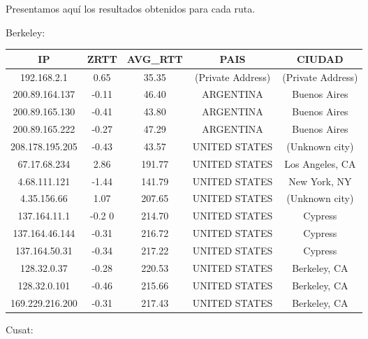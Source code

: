 Presentamos aquí los resultados obtenidos para cada ruta.

Berkeley:

\begin{tabular}{|c@{\hspace{5ex}}c@{\hspace{5ex}}c@{\hspace{5ex}}c@{\hspace{5ex}}c|}
 \hline
 \rule{0pt}{1.2em}IP & ZRTT & AVG\_RTT & PAIS & CIUDAD\\[0.2em]
 \hline

\rule{0pt}{1.2em} 192.168.2.1  &  0.65 & 35.35 & (Private Address) & (Private Address) \\[0.2em]
\rule{0pt}{1.2em} 200.89.164.137  &  -0.11 & 46.40 & ARGENTINA & Buenos Aires \\[0.2em]
\rule{0pt}{1.2em} 200.89.165.130  &  -0.41 & 43.80 & ARGENTINA & Buenos Aires \\[0.2em]
\rule{0pt}{1.2em} 200.89.165.222  &  -0.27 & 47.29 & ARGENTINA & Buenos Aires \\[0.2em]
\rule{0pt}{1.2em} 208.178.195.205  &  -0.43 & 43.57 & UNITED STATES & (Unknown city) \\[0.2em]
\rule{0pt}{1.2em} 67.17.68.234  &  2.86 & 191.77 & UNITED STATES & Los Angeles, CA \\[0.2em]
\rule{0pt}{1.2em} 4.68.111.121  &  -1.44 & 141.79 & UNITED STATES & New York, NY \\[0.2em]
\rule{0pt}{1.2em} 4.35.156.66  &  1.07 & 207.65 & UNITED STATES & (Unknown city) \\[0.2em]
\rule{0pt}{1.2em} 137.164.11.1  &  -0.2 0& 214.70 & UNITED STATES & Cypress \\[0.2em]
\rule{0pt}{1.2em} 137.164.46.144  &  -0.31 & 216.72 & UNITED STATES & Cypress \\[0.2em]
\rule{0pt}{1.2em} 137.164.50.31  &  -0.34 & 217.22 & UNITED STATES & Cypress \\[0.2em]
\rule{0pt}{1.2em} 128.32.0.37  &  -0.28 & 220.53 & UNITED STATES & Berkeley, CA \\[0.2em]
\rule{0pt}{1.2em} 128.32.0.101  &  -0.46 & 215.66 & UNITED STATES & Berkeley, CA \\[0.2em]
\rule{0pt}{1.2em} 169.229.216.200  &  -0.31 & 217.43 & UNITED STATES & Berkeley, CA \\[0.2em]
\hline
 \end{tabular}

Cusat:

